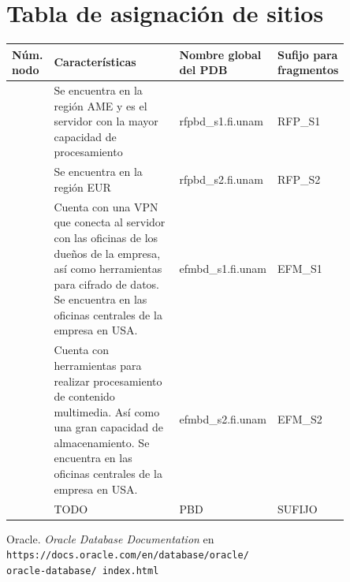 \documentclass{article}
\begin{document}

\section*{Tabla de asignación de sitios}

\newcommand{\nameTabBuilder}[1]{F\_RFP\_#1}
\newcommand{\subfixRfpSI}{RFP\_S1}
\newcommand{\subfixRfpSII}{RFP\_S2}
\newcommand{\subfixEfmSI}{EFM\_S1}
\newcommand{\subfixEfmSII}{EFM\_S2}
\newcommand{\pdbRfpSI}{rfpbd\_s1.fi.unam}
\newcommand{\pdbRfpSII}{rfpbd\_s2.fi.unam}
\newcommand{\pdbEfmSI}{efmbd\_s1.fi.unam}
\newcommand{\pdbEfmSII}{efmbd\_s2.fi.unam}

{
  \setlength\tabcolsep{3.5mm}
  \def\arraystretch{2}          %
  \begin{longtable}{
    |C{0.05\linewidth}
    |p{0.5\linewidth}
    |C{0.2\linewidth}
    |p{0.1\linewidth}|}
  \hline
  \textbf{Núm. nodo} &
  \textbf{Características} & 
  \textbf{Nombre global del PDB} & 
  \parbox[t]{2cm}{\centering \textbf{Sufijo para fragmentos}} 
  \\ \hline
    &
  Se encuentra en la región AME y es el servidor con la mayor capacidad 
  de procesamiento & 
 \pdbRfpSI & 
  \subfixRfpSI 
  \\ \hline
    &
  Se encuentra en la región EUR & 
 \pdbRfpSII & 
 \subfixRfpSII
  \\ \hline
    &
  Cuenta con una VPN que conecta al servidor con las oficinas de los dueños de 
  la empresa, así como herramientas para cifrado de datos. Se encuentra en las 
  oficinas centrales de la empresa en USA. & 
 \pdbEfmSI & 
 \subfixEfmSI
  \\ \hline
    &
  Cuenta con herramientas para realizar procesamiento de contenido multimedia. 
  Así como una gran capacidad de almacenamiento. Se encuentra en las oficinas 
  centrales de la empresa en USA. & 
 \pdbEfmSII & 
 \subfixEfmSII
  \\ \hline
    &
  TODO & 
  PBD & 
  SUFIJO
  \\ \hline
  \end{longtable}
}

\begin{thebibliography}{99}
     Oracle. \textit{Oracle Database Documentation} en 
        \texttt{https://docs.oracle.com/en/database/oracle/\\oracle-database/%
        index.html}
\end{thebibliography}
\end{document}

